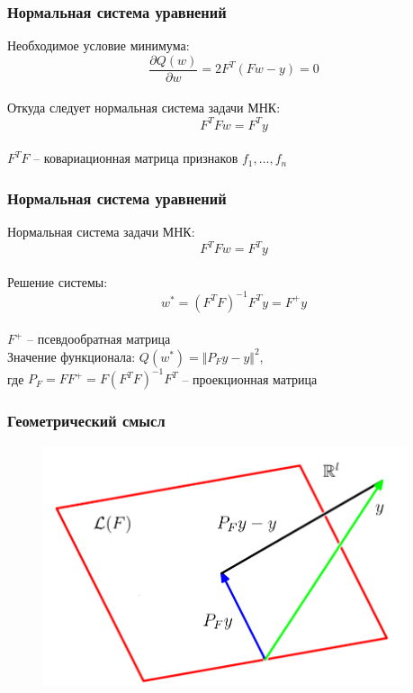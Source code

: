 \documentclass[10pt]{beamer}
\begin{document}
\begin{frame}\frametitle{Нормальная система уравнений}
Необходимое условие минимума:\\
$$\frac{\partial Q(w)}{\partial w}  = 2 F^T(F w - y) = 0$$\\
Откуда следует нормальная система задачи МНК:\\
$$F^TFw = F^Ty$$\\
$F^TF$ -- ковариационная матрица признаков $f_1, \dots, f_n$\\
\end{frame}

\begin{frame}\frametitle{Нормальная система уравнений}
Нормальная система задачи МНК:
$$F^TFw = F^Ty$$\\
Решение системы:\\
$$w^* = (F^TF)^{-1}F^Ty = F^+y$$\\
$F^+$ -- псевдообратная матрица\\
\vspace{5mm}
Значение функционала: $Q(w^*) = \Vert P_F y - y \Vert^2$,\\
где $P_F = FF^+ = F(F^TF)^{-1}F^T$ -- проекционная матрица
\end{frame}

\begin{frame}\frametitle{Геометрический смысл}
\begin{figure}[htbp]
  \includegraphics[height=200pt, keepaspectratio = true]{images/geometry}   
\end{figure}
\end{frame}
\end{document}
